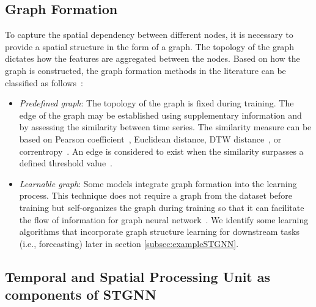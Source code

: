 \subsection{Graph Formation}\label{subsec:graph}
To capture the spatial dependency between different nodes, it is necessary to provide a spatial structure in the form of a graph. The topology of the graph dictates how the features are aggregated between the nodes. Based on how the graph is constructed, the graph formation methods in the literature can be classified as follows~\cite{bloemheuvel_graph_2024}:
\begin{itemize}
    \item \textit{Predefined graph}: The topology of the graph is fixed during training. The edge of the graph may be established using supplementary information and by assessing the similarity between time series. The similarity measure can be based on Pearson coefficient~\cite{fernandez_privacy-preserving_2022}, Euclidean distance, DTW distance~\cite{10202782}, or correntropy~\cite{cini_graph-based_2023}. An edge is considered to exist when the similarity surpasses a defined threshold value~\cite{bloemheuvel_graph_2024}.
    \item \textit{Learnable graph}: Some models integrate graph formation into the learning process. This technique does not require a graph from the dataset before training but self-organizes the graph during training so that it can facilitate the flow of information for graph neural network~\cite{wu_graph_nodate}. We identify some learning algorithms that incorporate graph structure learning for downstream tasks (i.e., forecasting) later in section \ref{subsec:exampleSTGNN}.
\end{itemize}

\subsection{Temporal and Spatial Processing Unit as components of STGNN}\label{subsec:processing}

